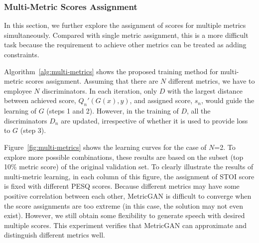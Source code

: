 \documentclass{article}
\begin{document}
\subsubsection{Multi-Metric Scores Assignment}
In this section, we further explore the assignment of scores for multiple metrics simultaneously. Compared with single metric assignment, this is a more difficult task because the requirement to achieve other metrics can be treated as adding constraints.


Algorithm~\ref{alg:multi-metrics} shows the proposed training method for multi-metric scores assignment. Assuming that there are $N$ different metrics, we have to employee $N$ discriminators. In each iteration, only $D$ with the largest distance between achieved score, $Q_n'(G(x),y)$, and assigned score, $s_n$, would guide the learning of $G$ (steps 1 and 2). However, in the training of $D$, all the discriminators $D_n$ are updated, irrespective of whether it is used to provide loss to $G$ (step 3). 

Figure~\ref{fig:multi-metrics} shows the learning curves for the case of $N$=2. To explore more possible combinations, these results are based on the subset (top 10\% metric score) of the original validation set. To clearly illustrate the results of multi-metric learning, in each column of this figure, the assignment of STOI score is fixed with different PESQ scores. Because different metrics may have some positive correlation between each other, MetricGAN is difficult to converge when the score assignments are too extreme (in this case, the solution may not even exist). However, we still obtain some flexibility to generate speech with desired multiple scores. This experiment verifies that MetricGAN can approximate and distinguish different metrics well. 
\end{document}
